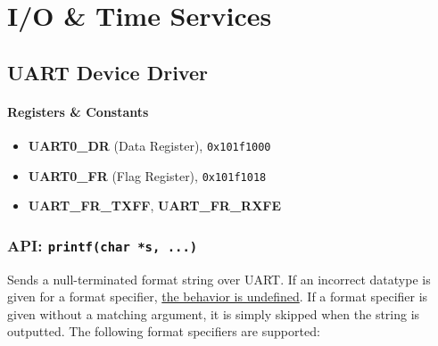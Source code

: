 \newpage
\chapter{I/O \& Time Services}

\section{UART Device Driver}
\subsubsection{Registers \& Constants}
\begin{itemize}
  \item \textbf{UART0\_DR} (Data Register), \texttt{0x101f1000}
  \item \textbf{UART0\_FR} (Flag Register), \texttt{0x101f1018}
  \item \textbf{UART\_FR\_TXFF}, \textbf{UART\_FR\_RXFE}
\end{itemize}

\subsection{API: \texttt{printf(char *s, ...)}}
Sends a null-terminated format string over UART. If an incorrect datatype is given 
for a format specifier, \underline{the behavior is undefined}. If a format specifier 
is given without a matching argument, it is simply skipped when the string is outputted. 
The following format specifiers are supported:

